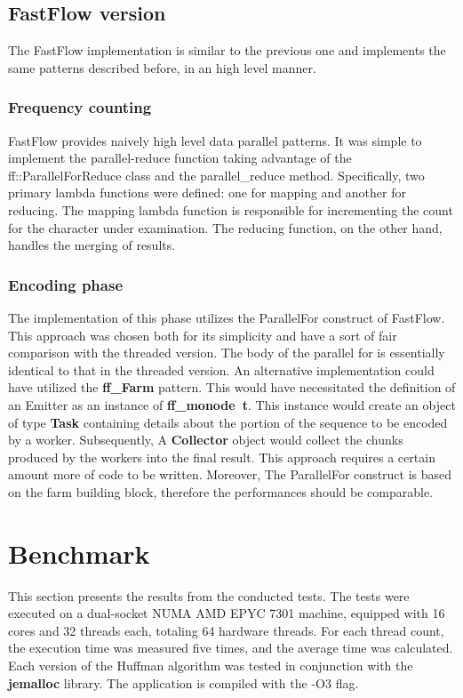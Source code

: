 \documentclass{article}
\begin{document}
\subsection{FastFlow version}
The FastFlow implementation is similar to the previous one and
implements the same patterns described before, in an high level manner.
\subsubsection{Frequency counting}
FastFlow provides naively high level data parallel patterns. It was simple
to implement the parallel-reduce function taking advantage of the ff::ParallelForReduce
class and the parallel\_reduce method.
Specifically, two primary lambda functions were defined: one for mapping and another for reducing.
The mapping lambda function is responsible for incrementing the count for the character under examination.
The reducing function, on the other hand, handles the merging of results.
\subsubsection{Encoding phase}
The implementation of this phase utilizes the ParallelFor construct of FastFlow.
This approach was chosen both for its simplicity and have a sort of fair comparison
with the threaded version. The body of the parallel for is essentially identical
to that in the threaded version.
An alternative implementation could have utilized the \textbf{ff\_Farm} pattern.
This would have necessitated the definition of an Emitter as an instance of \textbf{ff\_monode\ t}.
This instance would create an object of type \textbf{Task} containing details about the portion of the sequence to be
encoded by a worker. Subsequently, A \textbf{Collector} object would collect the chunks produced by the workers into the final result.
This approach requires a certain amount more of code to be written. Moreover, The ParallelFor
construct is based on the farm building block, therefore the performances should be comparable.

\section{Benchmark}
This section presents the results from the conducted tests. The tests were executed on a dual-socket NUMA
AMD EPYC 7301 machine, equipped with 16 cores and 32 threads each, totaling 64 hardware threads.
For each thread count, the execution time was measured five times, and the average time was calculated.
Each version of the Huffman algorithm was tested in conjunction with the \textbf{jemalloc} library.
The application is compiled with the -O3 flag.
\end{document}
